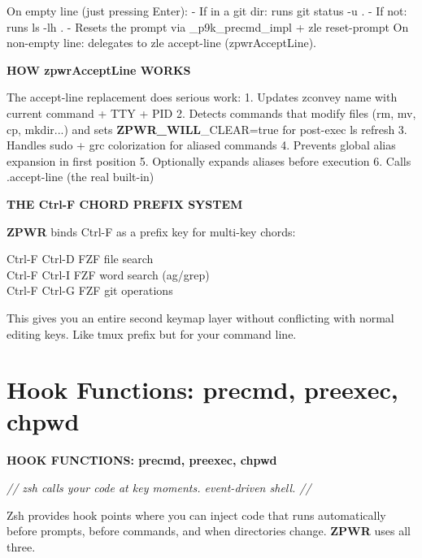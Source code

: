\documentclass[11pt,a4paper,twoside]{book}
\begin{document}
On empty line (just pressing Enter): - If in a git dir: runs git status -u . - If not: runs ls -lh . - Resets the prompt via \_p9k\_precmd\_impl + zle reset-prompt On non-empty line: delegates to zle accept-line (zpwrAcceptLine).


\vspace{12pt}
{\bfseries\color{neonyellow} HOW zpwrAcceptLine WORKS}\vspace{4pt}

The accept-line replacement does serious work: 1. Updates zconvey name with current command + TTY + PID 2. Detects commands that modify files (rm, mv, cp, mkdir...) and sets \textbf{ZPWR\_WILL}\_CLEAR=true for post-exec ls refresh 3. Handles sudo + grc colorization for aliased commands 4. Prevents global alias expansion in first position 5. Optionally expands aliases before execution 6. Calls .accept-line (the real built-in)


\vspace{12pt}
{\bfseries\color{neonyellow} THE Ctrl-F CHORD PREFIX SYSTEM}\vspace{4pt}

\textbf{ZPWR} binds Ctrl-F as a prefix key for multi-key chords:

\begin{codebox}
\color{neongreen}Ctrl-F Ctrl-D   FZF file search\\
\color{neongreen}Ctrl-F Ctrl-I   FZF word search (ag/grep)\\
\color{neongreen}Ctrl-F Ctrl-G   FZF git operations\\
\end{codebox}

This gives you an entire second keymap layer without conflicting with normal editing keys. Like tmux prefix but for your command line.


\vspace{16pt}

\section{Hook Functions: precmd, preexec, chpwd}


\vspace{10pt}
{\large\bfseries\color{neoncyan} HOOK FUNCTIONS: precmd, preexec, chpwd}\vspace{6pt}

{\small\itshape\color{dimtext} // zsh calls your code at key moments. event-driven shell. //}

Zsh provides hook points where you can inject code that runs automatically before prompts, before commands, and when directories change. \textbf{ZPWR} uses all three.
\end{document}
